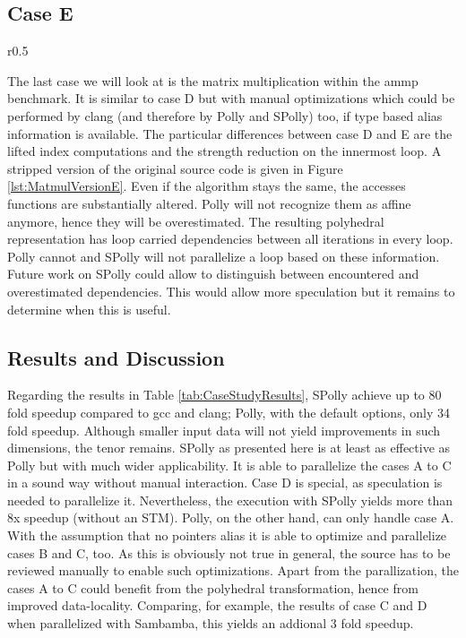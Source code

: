 \subsection*{Case E} 
\label{CaseStudyCaseE}
\begin{wrapfigure}[]{r}{0.5\textwidth}
    \hfill
    \hfill
  \begin{minipage}[c]{0.4\textwidth}
    \vspace*{-7mm}
    
    \end{minipage}
    \hfill
    \hfill
    \caption[Matrix multiplication case E]{Matrix multiplication case E, extracted from the ammp benchmark (SPEC 2000)}
    \vspace*{-5mm}
    \label{lst:MatmulVersionE}
\end{wrapfigure}
The last case we will look at is the matrix multiplication within the ammp 
benchmark. It is similar to case D but with manual optimizations which could
be performed by clang (and therefore by Polly and SPolly) too, if type based alias
information is available. The particular differences between case D and
E are the lifted index computations and the strength reduction on the innermost
loop.  A stripped version of the original source code is given in 
Figure \ref{lst:MatmulVersionE}.  Even if the algorithm stays the same, 
the accesses functions are substantially altered. Polly 
will not recognize them as affine anymore, hence they will be overestimated. The resulting 
polyhedral representation has loop carried dependencies between all iterations in 
every loop. Polly cannot and SPolly will not parallelize a loop based on these 
information. Future work on SPolly could allow to
distinguish between encountered and overestimated 
dependencies. This would allow more speculation but it remains to determine when this is useful. 

\subsection{Results and Discussion}
\label{CaseStudyResults}
Regarding the results in Table \ref{tab:CaseStudyResults}, SPolly 
achieve up to 80 fold speedup compared to gcc and clang; Polly, with the
default options, only 34 fold speedup. 
Although smaller input data will not yield improvements in such dimensions, 
the tenor remains. SPolly as presented here is at least as effective as
Polly but with much wider applicability. 
It is able to parallelize the cases A to C in a sound way 
without manual interaction. 
Case D is special, as speculation is needed to parallelize it. Nevertheless, 
the execution with SPolly yields more than 8x speedup (without an STM).
Polly, on the other hand, can only handle case A. With the assumption
that no pointers alias it is able to optimize and parallelize cases B and C, too.
As this is obviously not
true in general, the source has to be reviewed manually to enable such optimizations. 
Apart from the parallization, the cases A to C could benefit from the 
polyhedral transformation, hence from improved data-locality. 
Comparing, for example, the results of case C and D when parallelized with Sambamba, 
this yields an addional 3 fold speedup.

